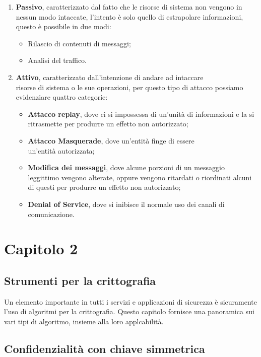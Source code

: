 \documentclass[14pt]{extarticle}
\begin{document}
\begin{enumerate}
    \item \textbf{Passivo}, caratterizzato dal fatto che le risorse di sistema
    non vengono in nessun modo intaccate, l'intento è solo quello di estrapolare
    informazioni, questo è possibile in due modi:
    \begin{itemize}
        \item Rilascio di contenuti di messaggi;
        \item Analisi del traffico.
    \end{itemize}
    \item \textbf{Attivo}, caratterizzato dall'intenzione di andare ad intaccare
    \\ risorse di sistema o le sue operazioni, per questo tipo di attacco
    possiamo evidenziare quattro categorie:
    \begin{itemize}
        \item \textbf{Attacco replay}, dove ci si impossessa di un'unità di
        informazioni e la si ritrasmette per produrre un effetto non
        autorizzato;
        \item \textbf{Attacco Masquerade}, dove un'entità finge di essere \\
        un'entità autorizzata;
        \item \textbf{Modifica dei messaggi}, dove alcune porzioni di un
        messaggio leggittimo vengono alterate, oppure vengono ritardati o
        riordinati alcuni di questi per produrre un effetto non autorizzato;
        \item \textbf{Denial of Service}, dove si inibisce il normale uso dei
        canali di comunicazione.
    \end{itemize} 
\end{enumerate}

\newpage
\section{Capitolo 2}

\subsection{Strumenti per la crittografia}

Un elemento importante in tutti i servizi e applicazioni di sicurezza è
sicuramente l'uso di algoritmi per la crittografia. Questo capitolo fornisce una
panoramica sui vari tipi di algoritmo, insieme alla loro applcabilità.

\subsection{Confidenzialità con chiave simmetrica}
\end{document}
